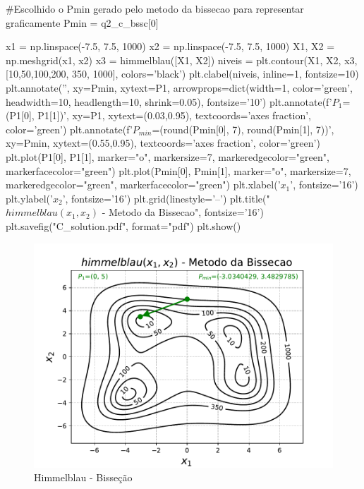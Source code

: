 \documentclass[10pt, a4paper]{article}
\begin{document}
\begin{python}
  #Escolhido o Pmin gerado pelo metodo da bissecao para representar graficamente
  Pmin = q2_c_bssc[0]

  x1 = np.linspace(-7.5, 7.5, 1000)
  x2 = np.linspace(-7.5, 7.5, 1000)
  X1, X2 = np.meshgrid(x1, x2)
  x3 = himmelblau([X1, X2])
  niveis = plt.contour(X1, X2, x3, [10,50,100,200, 350, 1000], colors='black')
  plt.clabel(niveis, inline=1, fontsize=10)
  plt.annotate('', xy=Pmin, xytext=P1,
                  arrowprops=dict(width=1, color='green', headwidth=10, headlength=10, shrink=0.05), fontsize='10')
  plt.annotate(f'$P_1$=({P1[0]}, {P1[1]})', xy=P1, xytext=(0.03,0.95), textcoords='axes fraction', color='green')
  plt.annotate(f'$P_{{min}}$=({round(Pmin[0], 7)}, {round(Pmin[1], 7)})', xy=Pmin, xytext=(0.55,0.95), textcoords='axes fraction', color='green')
  plt.plot(P1[0], P1[1], marker="o", markersize=7, markeredgecolor="green", markerfacecolor="green")
  plt.plot(Pmin[0], Pmin[1], marker="o", markersize=7, markeredgecolor="green", markerfacecolor="green")
  plt.xlabel('$x_1$', fontsize='16')
  plt.ylabel('$x_2$', fontsize='16')
  plt.grid(linestyle='--')
  plt.title("$himmelblau(x_1, x_2)$ - Metodo da Bissecao", fontsize='16')
  plt.savefig("C_solution.pdf", format="pdf")
  plt.show()
\end{python}

\begin{figure}[htpb]
  \centering
  \includegraphics[width=1\textwidth]{C_solution.pdf}
  \caption{Himmelblau - Bisseção}
  \label{fig:q2c}
\end{figure}
\end{document}
